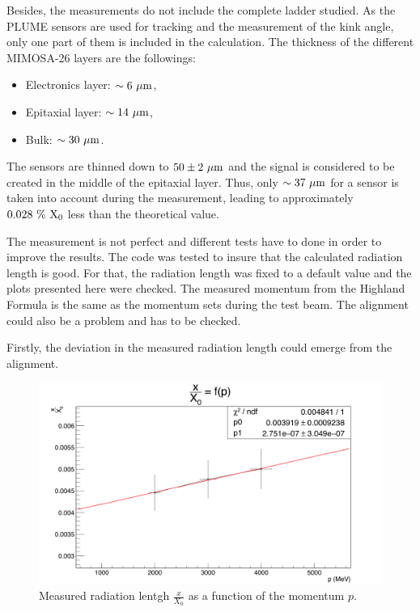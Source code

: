    Besides, the measurements do not include the complete ladder studied. 
   As the \gls{PLUME} sensors are used for tracking and the measurement of the kink angle, only one part of them is included in the calculation.
   The thickness of the different \gls{MIMOSA}-26 layers are the followings: 
   \begin{itemize}
     \item Electronics layer: $\sim 6~\rm{\mu m}$,
     \item Epitaxial layer: $\sim 14~\rm{\mu m}$,
     \item Bulk: $\sim 30~\rm{\mu m}$.
   \end{itemize}
   The sensors are thinned down to $50 \pm 2~\rm{\mu m}$ and the signal is considered to be created in the middle of the epitaxial layer. 
   Thus, only $\sim 37~\rm{\mu m}$ for a sensor is taken into account during the measurement, leading to approximately $0.028~\%~\rm{X_{0}}$ less than the theoretical value.

   The measurement is not perfect and different tests have to done in order to improve the results.
   The code was tested to insure that the calculated radiation length is good.
   For that, the radiation length was fixed to a default value and the plots presented here were checked.
   The measured momentum from the Highland Formula is the same as the momentum sets during the test beam.
   The alignment could also be a problem and has to be checked.

   Firstly, the deviation in the measured radiation length could emerge from the alignment.
  
   \begin{figure}
     \centering
     \includegraphics[width =\textwidth]{Pictures/X0/radiationLength_2-4GeV.png}
     \caption{Measured radiation lentgh $\frac{x}{X_0}$ as a function of the momentum $p$.}
     \label{fig:X0vsP}
   \end{figure}

